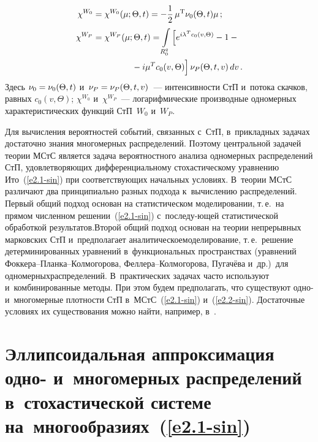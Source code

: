 \begin{multicols}{2}
\vspace*{-13pt}

\noindent
\begin{align*}
\chi^{W_0} &=\chi^{W_0} (\mu; \Theta, t) =- \fr{1}{2}\, \mu^{\mathrm{T}} 
\nu_0 (\Theta, t) \mu\,;\\
\chi^{W_P}&=\chi^{W_P} (\mu; \Theta, t) = \iii_{R_0^q} \left[ 
e^{i\la^T c_0(v,\Theta)} -1-{}\right.\\
&\left.\hspace*{15mm}{}-i\mu^T c_0(v,\Theta)\vphantom{e^{i\la^T c_0(v,\Theta)}}
\right] \nu_P 
(\Theta, t,v)\,dv\,.
\end{align*}
Здесь $\nu_0 \hm=\nu_0 (\Theta, t)$ и~$\nu_P\hm=\nu_P(\Theta, t,v)$~--- 
интенсивности СтП и~потока скачков, равных $c_0(v,\Theta)$; $\chi^{W_0}$ 
и~$\chi^{W_P}$~--- логарифмические производные одномерных характеристических 
функций СтП~$W_0$ и~$W_P$.

Для вычисления вероятностей событий,
связанных с~СтП, в~прикладных задачах достаточно
знания многомерных распределений. Поэтому центральной
задачей теории МСтС является задача вероятност\-ного анализа одномерных
распределений СтП, удовлетворяющих дифференциальному стохастическому
уравнению Ито~(\ref{e2.1-sin}) при соответствующих начальных условиях.
В~теории МСтС различают два принципиально разных подхода
к~вычислению распределений. Первый общий подход основан на
статистическом моделировании, т.\,е.\ на прямом численном решении~(\ref{e2.1-sin}) 
с~последу-\linebreak ющей статистической обработкой результатов.\linebreak Второй общий
подход основан на теории непрерывных марковских СтП 
и~предполагает аналитическое\linebreak моделирование, т.\,е.\ решение
детерминированных уравнений в~функциональных пространствах
(уравнений Фок\-ке\-ра--План\-ка--Кол\-мо\-го\-ро\-ва, Фел\-ле\-ра--Кол\-мо\-го\-ро\-ва,
Пугачёва и~др.)\ для одномерных\linebreak распределений. 
В~практических задачах час\-то используют и~комбинированные методы. При
этом будем предполагать, что существуют  одно- и~многомерные
плотности СтП в~МСтС~(\ref{e2.1-sin}) и~(\ref{e2.2-sin}). Достаточные условиях их
существования можно найти, например, в~\cite{1-sin, 2-sin, 12-sin}.

\vspace*{-9pt}

\section{Эллипсоидальная аппроксимация одно- и~многомерных распределений в~стохастической
системе на~многообразиях~(\ref{e2.1-sin})}


\end{multicols}
